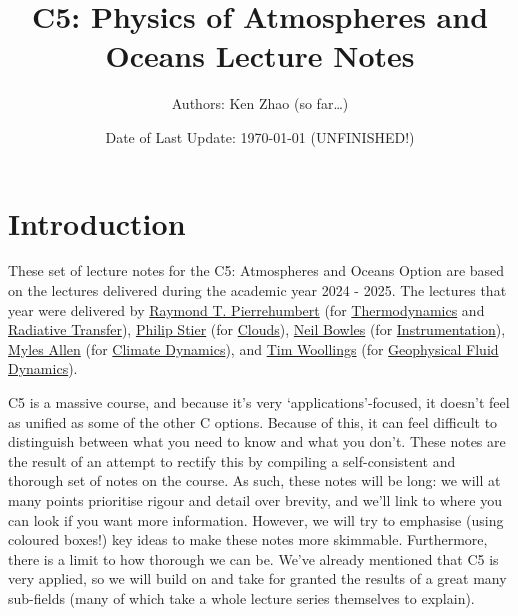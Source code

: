 \documentclass[a4paper,11pt]{report}
\title{C5: Physics of Atmospheres and Oceans Lecture Notes}
\author{Authors: Ken Zhao (so far\dots)}
\date{Date of Last Update: \today \hspace{2mm} (UNFINISHED!)}
\begin{document}
\begin{titlingpage}
\maketitle
\end{titlingpage}

\tableofcontents

\newpage

\begin{sloppypar}

\section*{Introduction}

These set of lecture notes for the C5: Atmospheres and Oceans Option are based on the lectures delivered during the academic year 2024 - 2025. The lectures that year were delivered by 
\href{https://users.physics.ox.ac.uk/~pierrehumbert/}{Raymond T. Pierrehumbert} 
(for \hyperref[Thermodynamics]{Thermodynamics} and \hyperref[Radiative Transfer]{Radiative Transfer}), 
\href{https://www.physics.ox.ac.uk/our-people/stier}{Philip Stier} 
(for \hyperref[Clouds]{Clouds}), 
\href{https://www.physics.ox.ac.uk/our-people/bowles}{Neil Bowles} 
(for \hyperref[Instrumentation]{Instrumentation}), 
\href{https://www.physics.ox.ac.uk/our-people/allenm}{Myles Allen} 
(for \hyperlink{Climate Dynamics}{Climate Dynamics}), and \href{https://www.physics.ox.ac.uk/our-people/woollings}{Tim Woollings} 
(for \hyperref[Geophysical Fluid Dynamics]{Geophysical Fluid Dynamics}).

C5 is a massive course, and because it's very `applications'-focused, it doesn't feel as unified as some of the other C options. Because of this, it can feel difficult to distinguish between what you need to know and what you don't. These notes are the result of an attempt to rectify this by compiling a self-consistent and thorough set of notes on the course. As such, these notes will be long: we will at many points prioritise rigour and detail over brevity, and we'll link to where you can look if you want more information. However, we will try to emphasise (using coloured boxes!) key ideas to make these notes more skimmable. Furthermore, there is a limit to how thorough we can be. We've already mentioned that C5 is very applied, so we will build on and take for granted the results of a great many sub-fields (many of which take a whole lecture series themselves to explain).


\end{sloppypar}
\end{document}
